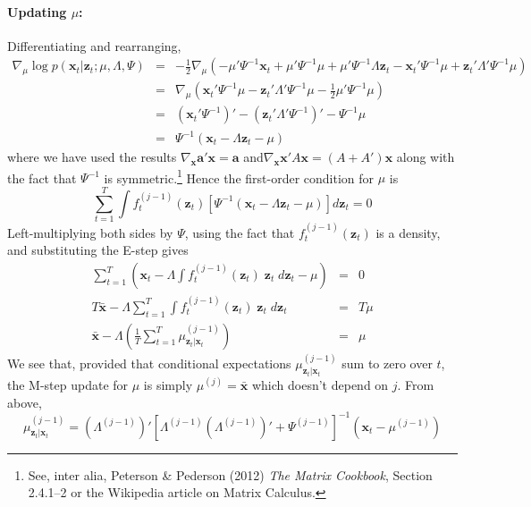 \documentclass[12pt]{article}
\theoremstyle{definition}
\begin{document}
\paragraph{Updating $\mu$:} Differentiating and rearranging, 
 \begin{eqnarray*}
 	\nabla_\mu \log p(\mathbf{x}_t|\mathbf{z}_t;\mu, \Lambda, \Psi) &=& -\frac{1}{2} \nabla_\mu \left( -\mu' \Psi^{-1} \mathbf{x}_t + \mu' \Psi^{-1}\mu + \mu' \Psi^{-1} \Lambda \mathbf{z}_t - \mathbf{x}_t' \Psi^{-1} \mu +  \mathbf{z}_t'\Lambda' \Psi^{-1} \mu  \right)\\
 		&=& \nabla_\mu \left(\mathbf{x}_t' \Psi^{-1} \mu - \mathbf{z}_t' \Lambda' \Psi^{-1}\mu - \frac{1}{2} \mu' \Psi^{-1} \mu \right)\\
 		&=& \left(\mathbf{x}_t' \Psi^{-1}\right)' - \left(\mathbf{z}_t'\Lambda'\Psi^{-1}\right)' - \Psi^{-1}\mu\\
 		&=& \Psi^{-1}\left(\mathbf{x}_t  - \Lambda\mathbf{z}_t - \mu\right)
 \end{eqnarray*}
where we have used the results $\nabla_{\mathbf{x}}\mathbf{a}' \mathbf{x} = \mathbf{a}$ and$\nabla_{\mathbf{x}}\mathbf{x}'A \mathbf{x} = (A + A')\mathbf{x}$ along with the fact that $\Psi^{-1}$ is symmetric.\footnote{See, inter alia, Peterson \& Pederson (2012) \emph{The Matrix Cookbook}, Section 2.4.1--2 or the Wikipedia article on Matrix Calculus.} Hence the first-order condition for $\mu$ is
$$\sum_{t = 1}^T \int f_t^{(j-1)}(\mathbf{z}_t) \left[\Psi^{-1}\left(\mathbf{x}_t  - \Lambda\mathbf{z}_t - \mu\right) \right] d \mathbf{z}_t = 0$$
Left-multiplying both sides by $\Psi$, using the fact that $f_t^{(j-1)}(\mathbf{z}_t)$ is a density, and substituting the E-step gives
	\begin{eqnarray*}
		\sum_{t = 1}^T \left( \mathbf{x}_t - \Lambda \int f_t^{(j-1)}(\mathbf{z}_t) \; \mathbf{z}_t \; d \mathbf{z}_t - \mu\right)   &=& 0\\
 T\bar{\mathbf{x}} - \Lambda \sum_{t = 1}^T \int f_t^{(j-1)}(\mathbf{z}_t) \; \mathbf{z}_t \; d\mathbf{z}_t &=& T \mu \\
 	\bar{\mathbf{x}}  - \Lambda \left( \frac{1}{T} \sum_{t=1}^T \mu^{(j-1)}_{\mathbf{z}_t|\mathbf{x}_t} \right) &=& \mu
	\end{eqnarray*}
We see that, provided that conditional expectations $\mu^{(j-1)}_{\mathbf{z}_t|\mathbf{x}_t}$ sum to zero over $t$, the M-step update for $\mu$ is simply $\mu^{(j)} = \bar{\mathbf{x}}$ which doesn't depend on $j$. From above, 
	$$\mu^{(j-1)}_{\mathbf{z}_t|\mathbf{x}_t} = \left(\Lambda^{(j-1)}\right)' \left[\Lambda^{(j-1)} \left(\Lambda^{(j-1)}\right)' + \Psi^{(j-1)}\right]^{-1} \left(\mathbf{x}_t - \mu^{(j-1)}\right)$$
\end{document}
